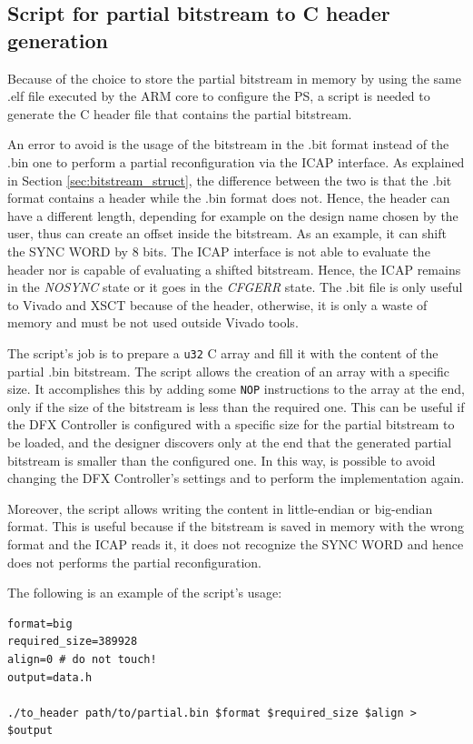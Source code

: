\subsection{Script for partial bitstream to C header generation}
\label{sec:script_header}

Because of the choice to store the partial bitstream in memory by using the same .elf file executed by the ARM core to configure the PS, a script is needed to generate the C header file that contains the partial bitstream. \bigskip

An error to avoid is the usage of the bitstream in the .bit format instead of the .bin one to perform a partial reconfiguration via the ICAP interface. As explained in Section \ref{sec:bitstream_struct}, the difference between the two is that the .bit format contains a header while the .bin format does not. Hence, the header can have a different length, depending for example on the design name chosen by the user, thus can create an offset inside the bitstream. As an example, it can shift the SYNC WORD by 8 bits. The ICAP interface is not able to evaluate the header nor is capable of evaluating a shifted bitstream. Hence, the ICAP remains in the \textit{NOSYNC} state or it goes in the \textit{CFGERR} state. The .bit file is only useful to Vivado and XSCT because of the header, otherwise, it is only a waste of memory and must be not used outside Vivado tools.\bigskip

The script's job is to prepare a \texttt{u32} C array and fill it with the content of the partial .bin bitstream. The script allows the creation of an array with a specific size. It accomplishes this by adding some \texttt{NOP} instructions to the array at the end, only if the size of the bitstream is less than the required one. This can be useful if the DFX Controller is configured with a specific size for the partial bitstream to be loaded, and the designer discovers only at the end that the generated partial bitstream is smaller than the configured one. In this way, is possible to avoid changing the DFX Controller's settings and to perform the implementation again. \bigskip

Moreover, the script allows writing the content in little-endian or big-endian format. This is useful because if the bitstream is saved in memory with the wrong format and the ICAP reads it, it does not recognize the SYNC WORD and hence does not performs the partial reconfiguration.\bigskip

The following is an example of the script's usage:
\begin{lstlisting}[style=preformatted]
format=big
required_size=389928
align=0 # do not touch!
output=data.h

./to_header path/to/partial.bin $format $required_size $align > $output
\end{lstlisting}
